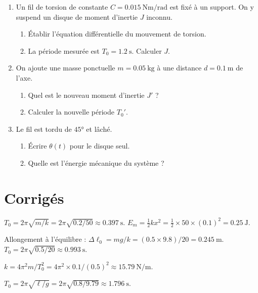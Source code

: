 \begin{enumerate}[label=\arabic*)]
    \item Un fil de torsion de constante $C = \SI{0.015}{\newton\metre\per\radian}$ est fixé à un support. On y suspend un disque de moment d'inertie $J$ inconnu.
    \begin{enumerate}[label=\alph*)]
        \item Établir l'équation différentielle du mouvement de torsion.
        \item La période mesurée est $T_0 = \SI{1.2}{\second}$. Calculer $J$.
    \end{enumerate}
    \item On ajoute une masse ponctuelle $m = \SI{0.05}{\kilogram}$ à une distance $d = \SI{0.1}{\metre}$ de l'axe.
    \begin{enumerate}[label=\alph*)]
        \item Quel est le nouveau moment d'inertie $J'$ ?
        \item Calculer la nouvelle période $T_0'$.
    \end{enumerate}
    \item Le fil est tordu de $\ang{45}$ et lâché.
    \begin{enumerate}[label=\alph*)]
        \item Écrire $\theta(t)$ pour le disque seul.
        \item Quelle est l'énergie mécanique du système ?
    \end{enumerate}
\end{enumerate}

\section{Corrigés}

$T_0 = 2\pi\sqrt{m/k} = 2\pi\sqrt{0.2/50} \approx \SI{0.397}{\second}$. $E_m = \frac{1}{2}k x^2 = \frac{1}{2} \times 50 \times (0.1)^2 = \SI{0.25}{\joule}$.

Allongement à l'équilibre : $\Delta\ell_0 = mg/k = (0.5 \times 9.8)/20 = \SI{0.245}{\metre}$. $T_0 = 2\pi\sqrt{0.5/20} \approx \SI{0.993}{\second}$.

$k = 4\pi^2 m / T_0^2 = 4\pi^2 \times 0.1 / (0.5)^2 \approx \SI{15.79}{\newton\per\metre}$.

$T_0 = 2\pi\sqrt{\ell/g} = 2\pi\sqrt{0.8/9.79} \approx \SI{1.796}{\second}$.

